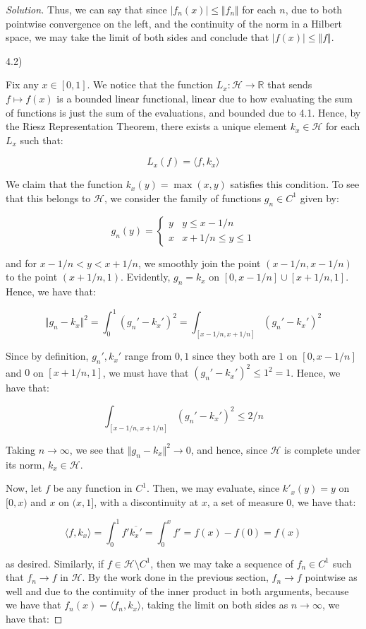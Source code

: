 \documentclass[10pt]{article}
\begin{document}
\begin{proof}[Solution]
Thus, we can say that since $|f_n(x)| \leq \Vert f_n \Vert$ for each $n$, due to both pointwise convergence on the left, and the continuity of the norm in a Hilbert space, we may take the limit of both sides and conclude that $|f(x)| \leq \Vert f \Vert$. 

4.2)

Fix any $x \in [0,1]$. We notice that the function $L_x: \mathcal{H} \to \mathbb{R}$ that sends $f \mapsto f(x)$ is a bounded linear functional, linear due to how evaluating the sum of functions is just the sum of the evaluations, and bounded due to 4.1. Hence, by the Riesz Representation Theorem, there exists a unique element $k_x \in \mathcal{H}$ for each $L_x$ such that:

$$ L_x(f) = \langle f, k_x \rangle$$

We claim that the function $k_x(y) = \max(x,y)$ satisfies this condition. To see that this belongs to $\mathcal{H}$, we consider the family of functions $g_n \in C^1$ given by:

$$ g_n(y) = \begin{cases} y & y \leq x - 1/n \\ x &   x+ 1/n \leq y \leq 1 \end{cases} $$

and for $x - 1/n < y < x + 1/n$, we smoothly join the point $(x-1/n, x-1/n)$ to the point $(x+1/n, 1)$. Evidently, $g_n = k_x$ on $[0,x-1/n] \cup [x+1/n, 1]$. Hence, we have that:

$$ \Vert g_n - k_x \Vert^2 = \int_0^1 (g_n' - k_x')^2 = \int_{[x-1/n, x+1/n]} (g_n' - k_x')^2  $$

Since by definition, $g_n', k_x'$ range from $0, 1$ since they both are $1$ on $[0, x-1/n]$ and $0$ on $[x+ 1/n, 1]$, we must have that $(g_n' - k_x')^2 \leq 1^2 = 1$. Hence, we have that:

$$ \int_{[x-1/n, x+1/n]} (g_n' - k_x')^2 \leq 2/n $$

Taking $n \to \infty$, we see that $\Vert g_n - k_x \Vert^2 \to 0$, and hence, since $\mathcal{H}$ is complete under its norm, $k_x \in \mathcal{H}$.

Now, let $f$ be any function in $C^1$. Then, we may evaluate, since $k'_x(y) = y$  on $[0,x)$ and $x$ on $(x,1]$, with a discontinuity at $x$, a set of measure 0, we have that: 

$$\langle f, k_x \rangle = \int_0^1 f' \overline{k_x'} = \int_0^x f' = f(x) - f(0) = f(x)$$

as desired. Similarly, if $f \in \mathcal{H} \setminus C^1$, then we may take a sequence of $f_n \in C^1$ such that $f_n \to f$ in $\mathcal{H}$. By the work done in the previous section, $f_n \to f$ pointwise as well and due to the continuity of the inner product in both arguments, because we have that $f_n(x) = \langle f_n, k_x \rangle$, taking the limit on both sides as $n \to \infty$, we have that:


\end{proof}
\end{document}

